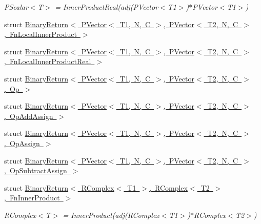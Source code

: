 \begin{DoxyCompactItemize}
\begin{DoxyCompactList}\small\item\em P\+Scalar$<$\+T$>$ = Inner\+Product\+Real(adj(\+P\+Vector$<$\+T1$>$)$\ast$\+P\+Vector$<$\+T1$>$) \end{DoxyCompactList}\item 
struct \mbox{\hyperlink{structENSEM_1_1BinaryReturn_3_01PVector_3_01T1_00_01N_00_01C_01_4_00_01PVector_3_01T2_00_01N_00_61a7f4ae3aaa63ae4a0c9c7a3983d045}{Binary\+Return$<$ P\+Vector$<$ T1, N, C $>$, P\+Vector$<$ T2, N, C $>$, Fn\+Local\+Inner\+Product $>$}}
\item 
struct \mbox{\hyperlink{structENSEM_1_1BinaryReturn_3_01PVector_3_01T1_00_01N_00_01C_01_4_00_01PVector_3_01T2_00_01N_00_ea08dc7f09ce8d8c0ce865f5402be2da}{Binary\+Return$<$ P\+Vector$<$ T1, N, C $>$, P\+Vector$<$ T2, N, C $>$, Fn\+Local\+Inner\+Product\+Real $>$}}
\item 
struct \mbox{\hyperlink{structENSEM_1_1BinaryReturn_3_01PVector_3_01T1_00_01N_00_01C_01_4_00_01PVector_3_01T2_00_01N_00_01C_01_4_00_01Op_01_4}{Binary\+Return$<$ P\+Vector$<$ T1, N, C $>$, P\+Vector$<$ T2, N, C $>$, Op $>$}}
\item 
struct \mbox{\hyperlink{structENSEM_1_1BinaryReturn_3_01PVector_3_01T1_00_01N_00_01C_01_4_00_01PVector_3_01T2_00_01N_00_01C_01_4_00_01OpAddAssign_01_4}{Binary\+Return$<$ P\+Vector$<$ T1, N, C $>$, P\+Vector$<$ T2, N, C $>$, Op\+Add\+Assign $>$}}
\item 
struct \mbox{\hyperlink{structENSEM_1_1BinaryReturn_3_01PVector_3_01T1_00_01N_00_01C_01_4_00_01PVector_3_01T2_00_01N_00_01C_01_4_00_01OpAssign_01_4}{Binary\+Return$<$ P\+Vector$<$ T1, N, C $>$, P\+Vector$<$ T2, N, C $>$, Op\+Assign $>$}}
\item 
struct \mbox{\hyperlink{structENSEM_1_1BinaryReturn_3_01PVector_3_01T1_00_01N_00_01C_01_4_00_01PVector_3_01T2_00_01N_00_691f1a9a29e289a86129e83b337c7d0f}{Binary\+Return$<$ P\+Vector$<$ T1, N, C $>$, P\+Vector$<$ T2, N, C $>$, Op\+Subtract\+Assign $>$}}
\item 
struct \mbox{\hyperlink{structENSEM_1_1BinaryReturn_3_01RComplex_3_01T1_01_4_00_01RComplex_3_01T2_01_4_00_01FnInnerProduct_01_4}{Binary\+Return$<$ R\+Complex$<$ T1 $>$, R\+Complex$<$ T2 $>$, Fn\+Inner\+Product $>$}}
\begin{DoxyCompactList}\small\item\em R\+Complex$<$\+T$>$ = Inner\+Product(adj(\+R\+Complex$<$\+T1$>$)$\ast$\+R\+Complex$<$\+T2$>$) \end{DoxyCompactList}\item 

\end{DoxyCompactItemize}
